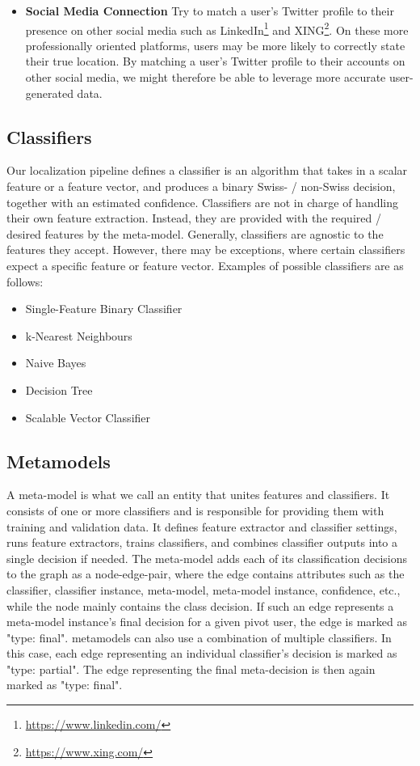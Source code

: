 \documentclass[10pt,a4paper]{article}
\begin{document}
\begin{itemize}
\item \textbf{Social Media Connection} Try to match a user's Twitter profile to their presence on other social media such as LinkedIn\footnote{\href{https://www.linkedin.com/}{https://www.linkedin.com/}} and XING\footnote{\href{https://www.xing.com/}{https://www.xing.com/}}. On these more professionally oriented platforms, users may be more likely to correctly state their true location. By matching a user's Twitter profile to their accounts on other social media, we might therefore be able to leverage more accurate user-generated data. 
\end{itemize}

\subsection{Classifiers}
Our localization pipeline defines a classifier is an algorithm that takes in a scalar feature or a feature vector, and produces  a binary Swiss- / non-Swiss decision, together with an estimated confidence. Classifiers are not in charge of handling their own feature extraction. Instead, they are provided with the required / desired features by the meta-model. Generally, classifiers are agnostic to the features they accept. However, there may be exceptions, where certain classifiers expect a specific feature or feature vector. Examples of possible classifiers are as follows:
\begin{itemize}
\item Single-Feature Binary Classifier
\item k-Nearest Neighbours
\item Naive Bayes
\item Decision Tree
\item Scalable Vector Classifier
\end{itemize}

\subsection{Metamodels}
A meta-model is what we call an entity that unites features and classifiers. It consists of one or more classifiers and is responsible for providing them with training and validation data. It defines feature extractor and classifier settings, runs feature extractors, trains classifiers, and combines classifier outputs into a single decision if needed. The meta-model adds each of its classification decisions to the graph as a node-edge-pair, where the edge contains attributes such as the classifier, classifier instance, meta-model, meta-model instance, confidence, etc., while the node mainly contains the class decision. If such an edge represents a meta-model instance's final decision for a given pivot user, the edge is marked as "type: final". metamodels can also use a combination of multiple classifiers. In this case, each edge representing an individual classifier's decision is marked as "type: partial". The edge representing the final meta-decision is then again marked as "type: final".
\end{document}
